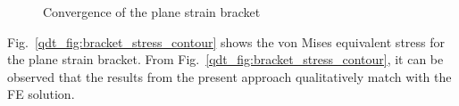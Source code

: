 \begin{figure}[H]
    \centering
    \caption[Convergence of the plane strain bracket]{Convergence of the plane strain bracket}
    \label{qdt_fig:ex_bracket_mesh_conv}
\end{figure}
%
Fig.~\ref{qdt_fig:bracket_stress_contour} shows the von Mises equivalent stress for the plane strain bracket.
From Fig.~\ref{qdt_fig:bracket_stress_contour}, it can be observed that the results from the present approach qualitatively match with the FE solution.
